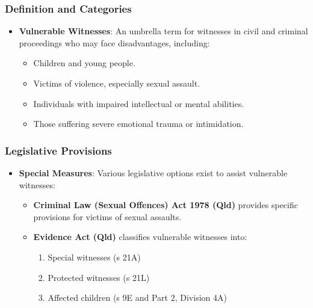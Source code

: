 \subsubsection{Definition and
Categories}\label{definition-and-categories}

\begin{itemize}
\tightlist
\item
  \textbf{Vulnerable Witnesses}: An umbrella term for witnesses in civil
  and criminal proceedings who may face disadvantages, including:

  \begin{itemize}
  \tightlist
  \item
    Children and young people.
  \item
    Victims of violence, especially sexual assault.
  \item
    Individuals with impaired intellectual or mental abilities.
  \item
    Those suffering severe emotional trauma or intimidation.
  \end{itemize}
\end{itemize}

\subsubsection{Legislative Provisions}\label{legislative-provisions}

\begin{itemize}
\tightlist
\item
  \textbf{Special Measures}: Various legislative options exist to assist
  vulnerable witnesses:

  \begin{itemize}
  \tightlist
  \item
    \textbf{Criminal Law (Sexual Offences) Act 1978 (Qld)} provides
    specific provisions for victims of sexual assaults.
  \item
    \textbf{Evidence Act (Qld)} classifies vulnerable witnesses into:

    \begin{enumerate}
    \def\labelenumi{\arabic{enumi}.}
    \tightlist
    \item
      Special witnesses (s 21A)
    \item
      Protected witnesses (s 21L)
    \item
      Affected children (s 9E and Part 2, Division 4A)
    \end{enumerate}
  \end{itemize}
\end{itemize}

